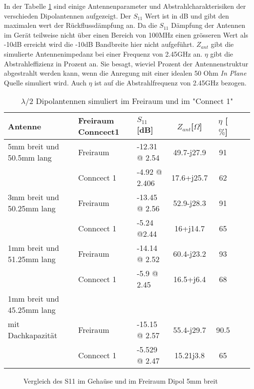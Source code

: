 In der Tabelle \ref{tab:Vergeich_Lambda/2_Freiraum_Geraet} sind einige Antennenparameter und Abstrahlcharakterisiken der verschieden Dipolantennen aufgezeigt. Der $S_{11}$ Wert ist in dB und gibt den maximalen wert der Rückflussdämpfung an. Da die $S_{11}$ Dämpfung der Antennen im Gerät teilweise nicht über einen Bereich von 100MHz einen grösseren Wert als -10dB erreicht wird die -10dB Bandbreite hier nicht aufgeführt.
$Z_{ant}$ gibt die simulierte Antennenimpedanz bei einer Frequenz von 2.45GHz an.
$\eta$ gibt die Abstrahleffizienz in Prozent an. Sie besagt, wieviel Prozent der Antennenstruktur abgestrahlt werden kann, wenn die Anregung mit einer idealen 50 Ohm \textit{In Plane} Quelle simuliert wird. Auch $\eta$ ist auf die Abstrahlfrequenz von 2.45GHz bezogen.

\begin{table}[!ht]
  \centering
  \begin{tabular}{p{4cm} p{2cm} l c c c r} 
  \toprule 
  Antenne                  	& Freiraum Conncect1	 & $S_{11}$[dB]	& $Z_{ant}$[$\Omega$] 	& $\eta$ [$\%$]\\ 
  \midrule
 5mm breit und 50.5mm lang    	& Freiraum			&	-12.31 @ 2.54		&  	49.7-j27.9		&   	91	\\
            					& Conncect 1   			&   -4.92 @ 2.406   		&	17.6+j25.7		& 	62	\\
 3mm breit und 50.25mm lang    & Freiraum			&    -13.45 @ 2.56  		&	52.9-j28.3		&	91	\\
     						& Conncect 1				&  	-5.24 @2.44			&	16+j14.7			&	65	\\
 1mm breit und 51.25mm lang  	& Freiraum			&    -14.14 @ 2.52    	&	60.4-j23.2		&	93	\\
      						& Conncect 1				&  	-5.9 @ 2.45			&	16.5+j6.4		&	68	\\
  1mm breit und 45.25mm lang \\
  mit Dachkapazität  		& Freiraum				&   -15.15 @ 2.57      	&	55.4-j29.7		&	90.5	\\
      						& Conncect 1				&  	-5.529 @ 2.47		&	15.21j3.8		&	65	\\
 \bottomrule
  \end{tabular}
  \caption{$\lambda/2$ Dipolantennen simuliert im Freiraum und im "Connect 1"}
  \label{tab:Vergeich_Lambda/2_Freiraum_Geraet}
\end{table}
\begin{figure}[!ht]
	\centering
	\begingroup
	
	\endgroup
	\caption{Vergleich des S11 im Gehaüse und im Freiraum Dipol 5mm breit}
	\label{S11_Vergleich_Simulation_5mm}
\end{figure}

